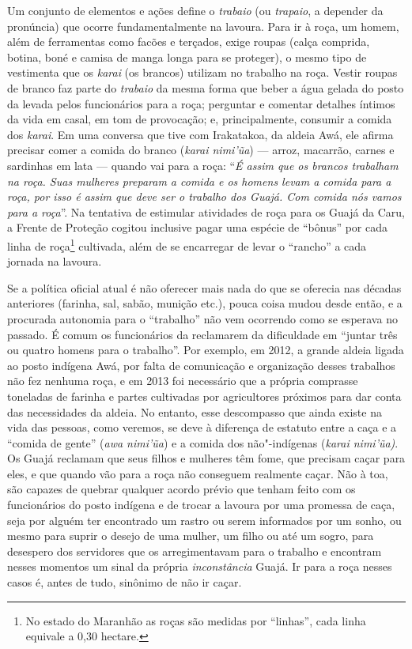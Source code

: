 Um conjunto de elementos e ações define o \emph{trabaio} (ou
\emph{trapaio}, a depender da pronúncia) que ocorre fundamentalmente na
lavoura. Para ir à roça, um homem, além de ferramentas como facões e
terçados, exige roupas (calça comprida, botina, boné e camisa de manga
longa para se proteger), o mesmo tipo de vestimenta que os \emph{karai}
(os brancos) utilizam no trabalho na roça. Vestir roupas de branco faz
parte do \emph{trabaio} da mesma forma que beber a água gelada do posto
da  levada pelos funcionários para a roça; perguntar e comentar
detalhes íntimos da vida em casal, em tom de provocação; e,
principalmente, consumir a comida dos \emph{karai}. Em uma conversa que
tive com Irakatakoa, da aldeia Awá, ele afirma precisar comer a
comida do branco (\emph{karai nimi'ũa}) --- arroz, macarrão, carnes e
sardinhas em lata --- quando vai para a roça: ``\emph{É assim que os
brancos trabalham na roça. Suas mulheres preparam a comida e os homens
levam a comida para a roça, por isso é assim que deve ser o trabalho dos
Guajá. Com comida nós vamos para a roça}''. Na tentativa de estimular
atividades de roça para os Guajá da  Caru, a Frente de Proteção
cogitou inclusive pagar uma espécie de ``bônus'' por cada linha de
roça\footnote{No estado do Maranhão as roças são medidas por ``linhas'',
  cada linha equivale a 0,30 hectare.} cultivada, além de se encarregar
de levar o ``rancho'' a cada jornada na lavoura.

Se a política oficial atual é não oferecer mais nada do que se oferecia
nas décadas anteriores (farinha, sal, sabão, munição etc.), pouca coisa
mudou desde então, e a procurada autonomia para o ``trabalho'' não vem
ocorrendo como se esperava no passado. É comum os funcionários da 
reclamarem da dificuldade em ``juntar três ou quatro homens para o
trabalho''. Por exemplo, em 2012, a grande aldeia ligada ao posto
indígena Awá, por falta de comunicação e organização desses
trabalhos não fez nenhuma roça, e em 2013 foi necessário que a própria
 comprasse toneladas de farinha e partes cultivadas por
agricultores próximos para dar conta das necessidades da aldeia. No
entanto, esse descompasso que ainda existe na vida das pessoas, como
veremos, se deve à diferença de estatuto entre a caça e a ``comida de
gente'' (\emph{awa nimi'ũa}) e a comida dos não"-indígenas (\emph{karai
nimi'ũa)}. Os Guajá reclamam que seus filhos e mulheres têm fome, que
precisam caçar para eles, e que quando vão para a roça não conseguem
realmente caçar. Não à toa, são capazes de quebrar qualquer acordo
prévio que tenham feito com os funcionários do posto indígena e de
trocar a lavoura por uma promessa de caça, seja por alguém ter
encontrado um rastro ou serem informados por um sonho, ou mesmo para
suprir o desejo de uma mulher, um filho ou até um sogro, para desespero
dos servidores que os arregimentavam para o trabalho e encontram nesses
momentos um sinal da própria \emph{inconstância} Guajá. Ir para a roça
nesses casos é, antes de tudo, sinônimo de não ir caçar.

